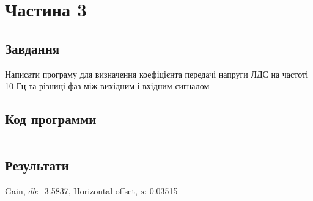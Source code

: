 \section{Частина 3}
\label{sec:task3}

\subsection{Завдання}
\label{subsec:task3_task}

Написати програму для визначення коефіцієнта передачі напруги ЛДС
на частоті 10 Гц та різниці фаз між вихідним і вхідним сигналом

\subsection{Код программи}
\label{subsec:task3_code}
\inputminted{python}{../src/task3.py}

\subsection{Результати}
\label{subsec:task3_results}

Gain, $db$: -3.5837, Horizontal offset, $s$: 0.03515

